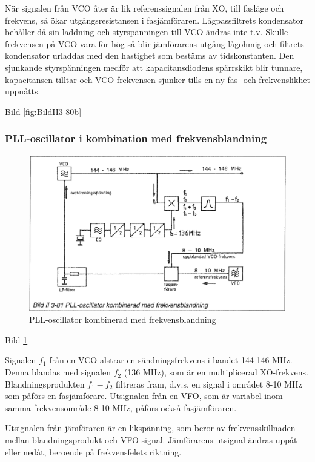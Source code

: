När signalen från VCO åter är lik referenssignalen från XO, till
fasläge och frekvens, så ökar utgångsresistansen i
fasjämföraren. Lågpassfiltrets kondensator behåller då sin laddning
och styrspänningen till VCO ändras inte t.v. Skulle frekvensen på VCO
vara för hög så blir jämförarens utgång lågohmig och filtrets
kondensator urladdas med den hastighet som bestäms av tidskonstanten.
Den sjunkande styrspänningen medför att kapacitansdiodens
spärrskikt blir tunnare, kapacitansen tilltar och VCO-frekvensen
sjunker tills en ny fas- och frekvenslikhet uppnåtts.

Bild \ref{fig:BildII3-80b}

\subsubsection{PLL-oscillator i kombination med frekvensblandning}

\begin{figure}
\includegraphics[width=\textwidth]{images/bild_2_3-81}
\caption{PLL-oscillator kombinerad med frekvensblandning}
\label{fig:BildII3-81}
\end{figure}

Bild \ref{fig:BildII3-81}

Signalen \(f_1\) från en VCO alstrar en sändningsfrekvens i bandet
144-146 MHz. Denna blandas med signalen \(f_2\) (136 MHz), som är en
multiplicerad XO-frekvens. Blandningsprodukten \(f_1 - f_2\) filtreras
fram, d.v.s. en signal i området 8-10 MHz som påförs en fasjämförare.
Utsignalen från en VFO, som är variabel inom samma frekvensområde 8-10
MHz, påförs också fasjämföraren.

Utsignalen från jämföraren är en likspänning, som beror av
frekvensskillnaden mellan blandningsprodukt och
VFO-signal. Jämförarens utsignal ändras uppåt eller nedåt, beroende på
frekvensfelets riktning.

